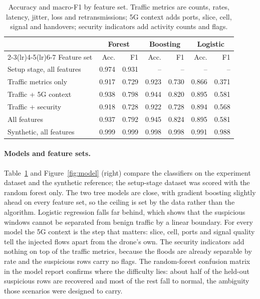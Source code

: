 \documentclass[10pt,twocolumn]{article}
\begin{document}
\begin{table}[H]
\centering\small
\caption{Accuracy and macro-F1 by feature set. Traffic metrics are counts, rates, latency, jitter, loss and retransmissions; 5G context adds ports, slice, cell, signal and handovers; security indicators add activity counts and flags.}
\label{tab:model}
\footnotesize
\setlength{\tabcolsep}{2.5pt}
\begin{tabular}{@{}lrrrrrr@{}}
\toprule
& \multicolumn{2}{c}{Forest} & \multicolumn{2}{c}{Boosting} & \multicolumn{2}{c}{Logistic} \\
\cmidrule(lr){2-3}\cmidrule(lr){4-5}\cmidrule(lr){6-7}
Feature set & Acc. & F1 & Acc. & F1 & Acc. & F1 \\
\midrule
Setup stage, all features & 0.974 & 0.931 & -- & -- & -- & -- \\
Traffic metrics only & 0.917 & 0.729 & 0.923 & 0.730 & 0.866 & 0.371 \\
Traffic + 5G context & 0.938 & 0.798 & 0.944 & 0.820 & 0.895 & 0.581 \\
Traffic + security & 0.918 & 0.728 & 0.922 & 0.728 & 0.894 & 0.568 \\
All features & 0.937 & 0.792 & 0.945 & 0.824 & 0.895 & 0.581 \\
Synthetic, all features & 0.999 & 0.999 & 0.998 & 0.998 & 0.991 & 0.988 \\
\bottomrule
\end{tabular}
\end{table}

\paragraph{Models and feature sets.} Table~\ref{tab:model} and
Figure~\ref{fig:model} (right) compare the classifiers on the experiment
dataset and the synthetic reference; the
setup-stage dataset was scored with the random forest only. The two tree
models are close, with gradient boosting slightly ahead on every feature set,
so the ceiling is set by the data rather than the algorithm. Logistic
regression falls far behind, which shows that the suspicious windows cannot
be separated from benign traffic by a linear boundary. For every model the
5G context is the step that matters: slice, cell, ports and signal quality
tell the injected flows apart from the drone's own. The security indicators
add nothing on top of the traffic metrics, because the floods are already
separable by rate and the suspicious rows carry no flags. The random-forest
confusion matrix in the model report confirms where the difficulty lies: about half of the held-out
suspicious rows are recovered and most of the rest fall to normal, the
ambiguity those scenarios were designed to carry.
\end{document}
